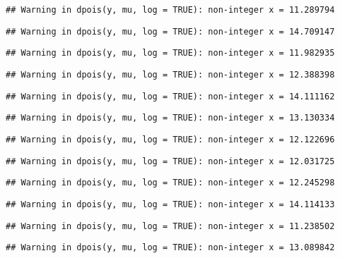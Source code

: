 \documentclass[
]{article}
\begin{document}
\begin{verbatim}
## Warning in dpois(y, mu, log = TRUE): non-integer x = 11.289794
\end{verbatim}

\begin{verbatim}
## Warning in dpois(y, mu, log = TRUE): non-integer x = 14.709147
\end{verbatim}

\begin{verbatim}
## Warning in dpois(y, mu, log = TRUE): non-integer x = 11.982935
\end{verbatim}

\begin{verbatim}
## Warning in dpois(y, mu, log = TRUE): non-integer x = 12.388398
\end{verbatim}

\begin{verbatim}
## Warning in dpois(y, mu, log = TRUE): non-integer x = 14.111162
\end{verbatim}

\begin{verbatim}
## Warning in dpois(y, mu, log = TRUE): non-integer x = 13.130334
\end{verbatim}

\begin{verbatim}
## Warning in dpois(y, mu, log = TRUE): non-integer x = 12.122696
\end{verbatim}

\begin{verbatim}
## Warning in dpois(y, mu, log = TRUE): non-integer x = 12.031725
\end{verbatim}

\begin{verbatim}
## Warning in dpois(y, mu, log = TRUE): non-integer x = 12.245298
\end{verbatim}

\begin{verbatim}
## Warning in dpois(y, mu, log = TRUE): non-integer x = 14.114133
\end{verbatim}

\begin{verbatim}
## Warning in dpois(y, mu, log = TRUE): non-integer x = 11.238502
\end{verbatim}

\begin{verbatim}
## Warning in dpois(y, mu, log = TRUE): non-integer x = 13.089842
\end{verbatim}
\end{document}
